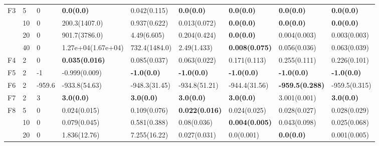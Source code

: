 \begin{longtable}{|l|l|l|l|l|l|l|l|l|}
F3             & 5   & 0        & \textbf{0.0(0.0)}             & 0.042(0.115)                & \textbf{0.0(0.0)}       & \textbf{0.0(0.0)}         & \textbf{0.0(0.0)}      & \textbf{0.0(0.0)}     \\
\cmidrule{2-9} & 10  & 0        & 200.3(1407.0)                 & 0.937(0.622)                & 0.013(0.072)            & \textbf{0.0(0.0)}         & \textbf{0.0(0.0)}      & \textbf{0.0(0.0)}     \\
\cmidrule{2-9} & 20  & 0        & 901.7(3786.0)                 & 4.49(6.605)                 & 0.204(0.424)            & \textbf{0.0(0.0)}         & 0.004(0.003)           & 0.003(0.003)          \\
\cmidrule{2-9} & 40  & 0        & 1.27e+04(1.67e+04)            & 732.4(1484.0)               & 2.49(1.433)             & \textbf{0.008(0.075)}     & 0.056(0.036)           & 0.063(0.039)          \\ \hline
F4             & 2   & 0        & \textbf{0.035(0.016)}         & 0.085(0.037)                & 0.063(0.022)            & 0.171(0.113)              & 0.255(0.111)           & 0.226(0.101)          \\ \hline
F5             & 2   & -1        & -0.999(0.009)                 & \textbf{-1.0(0.0)}          & \textbf{-1.0(0.0)}      & \textbf{-1.0(0.0)}        & \textbf{-1.0(0.0)}     & \textbf{-1.0(0.0)}    \\ \hline
F6             & 2   & -959.6   & -933.8(54.63)                 & -948.3(31.45)               & -934.8(51.21)           & -944.4(31.56)             & \textbf{-959.5(0.288)} & -959.5(0.315)         \\ \hline
F7             & 2   & 3        & \textbf{3.0(0.0)}             & \textbf{3.0(0.0)}           & \textbf{3.0(0.0)}       & \textbf{3.0(0.0)}         & 3.001(0.001)           & \textbf{3.0(0.0)}     \\ \hline
F8             & 5   & 0        & 0.024(0.015)                  & 0.109(0.076)                & \textbf{0.022(0.016)}   & 0.024(0.025)              & 0.028(0.027)           & 0.028(0.029)          \\
\cmidrule{2-9} & 10  & 0        & 0.079(0.045)                  & 0.581(0.388)                & 0.08(0.036)             & \textbf{0.004(0.005)}     & 0.043(0.098)           & 0.025(0.068)          \\
\cmidrule{2-9} & 20  & 0        & 1.836(12.76)                  & 7.255(16.22)                & 0.027(0.031)            & 0.0(0.001)                & \textbf{0.0(0.0)}      & 0.001(0.005)          \\

\end{longtable}
